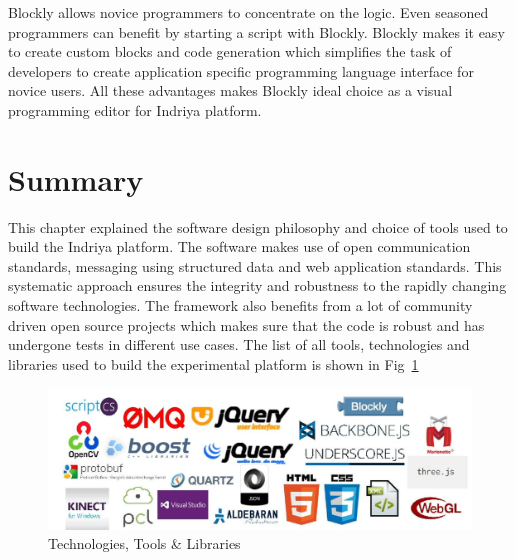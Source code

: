 Blockly allows novice programmers to concentrate on the logic. Even seasoned programmers can benefit by starting a script with Blockly. Blockly makes it easy to create custom blocks and code generation which simplifies the task of developers to create application specific programming language interface for novice users. All these advantages makes Blockly ideal choice as a visual programming editor for Indriya platform.
\section{Summary}
This chapter explained the software design philosophy and choice of tools used to build the Indriya platform. The software makes use of open communication standards, messaging using structured data and web application standards. This systematic approach ensures the integrity and robustness to the rapidly changing software technologies. The framework also benefits from a lot of community driven open source projects which makes sure that the code is robust and has undergone tests in different use cases. The list of all tools, technologies and libraries used to build the experimental platform is shown in Fig~\ref{fig:libraries_used}
\begin{figure}
\centering
\includegraphics[width=\textwidth]{assets/libs.jpg}
\caption[Technologies, Tools \& Libraries]{Technologies, Tools \& Libraries}
\label{fig:libraries_used}
\end{figure}
